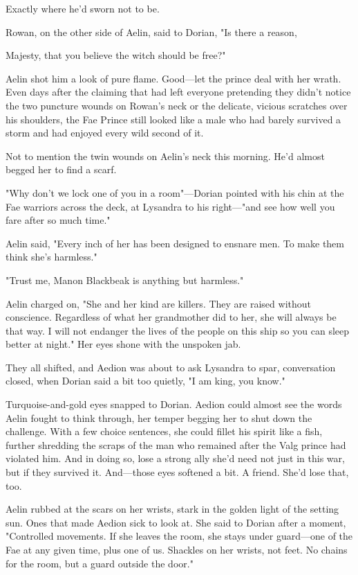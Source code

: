 Exactly where he'd sworn not to be.

Rowan, on the other side of Aelin, said to Dorian, "Is there a reason,

Majesty, that you believe the witch should be free?"

Aelin shot him a look of pure flame. Good---let the prince deal with her wrath. Even days after the claiming that had left everyone pretending they didn't notice the two puncture wounds on Rowan's neck or the delicate, vicious scratches over his shoulders, the Fae Prince still looked like a male who had barely survived a storm and had enjoyed every wild second of it.

Not to mention the twin wounds on Aelin's neck this morning. He'd almost begged her to find a scarf.

"Why don't we lock one of you in a room"---Dorian pointed with his chin at the Fae warriors across the deck, at Lysandra to his right---"and see how well you fare after so much time."

Aelin said, "Every inch of her has been designed to ensnare men. To make them think she's harmless."

"Trust me, Manon Blackbeak is anything but harmless."

Aelin charged on, "She and her kind are killers. They are raised without conscience. Regardless of what her grandmother did to her, she will always be that way. I will not endanger the lives of the people on this ship so you can sleep better at night." Her eyes shone with the unspoken jab.

They all shifted, and Aedion was about to ask Lysandra to spar, conversation closed, when Dorian said a bit too quietly, "I am king, you know."

Turquoise-and-gold eyes snapped to Dorian. Aedion could almost see the words Aelin fought to think through, her temper begging her to shut down the challenge. With a few choice sentences, she could fillet his spirit like a fish, further shredding the scraps of the man who remained after the Valg prince had violated him. And in doing so, lose a strong ally she'd need not just in this war, but if they survived it. And---those eyes softened a bit. A friend. She'd lose that, too.

Aelin rubbed at the scars on her wrists, stark in the golden light of the setting sun. Ones that made Aedion sick to look at. She said to Dorian after a moment, "Controlled movements. If she leaves the room, she stays under guard---one of the Fae at any given time, plus one of us. Shackles on her wrists, not feet. No chains for the room, but a guard outside the door."

